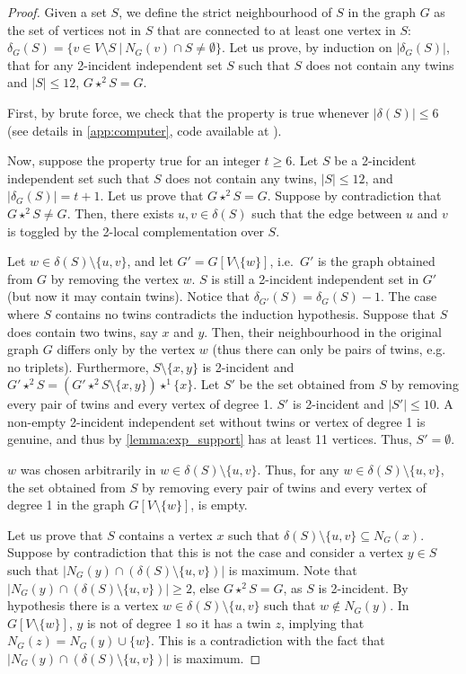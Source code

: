 \documentclass[a4paper,UKenglish,cleveref,autoref,thm-restate]{arxiv}
\newcommand{\se}{\subseteq}
\newcommand{\ls}{\leqslant}
\newcommand{\gs}{\geqslant}
\newcommand{\sm}{\setminus}
\begin{document}
\lessthantwelve*

\begin{proof}
    Given a set $S$, we define the strict neighbourhood of $S$ in the graph $G$ as the set of vertices not in $S$ that are connected to at least one vertex in $S$: $\delta_G(S) = \{v \in V \sm S ~|~ N_G(v) \cap S \neq \emptyset\}$. Let us prove, by induction on $|\delta_G(S)|$, that for any 2-incident independent set $S$ such that $S$ does not contain any twins and $|S| \ls 12$, $G \star^2 S = G$.

    First, by brute force, we check that the property is true whenever $|\delta(S)| \ls 6$ (see details in \cref{app:computer}, code available at \cite{codelulc19}). 

    Now, suppose the property true for an integer $t \gs 6$. Let $S$ be a 2-incident independent set such that $S$ does not contain any twins, $|S| \ls 12$, and $|\delta_G(S)| = t+1$. Let us prove that $G \star^{2} S = G$. Suppose by contradiction that $G \star^{2} S \neq G$. Then, there exists $u,v \in \delta(S)$ such that the edge between $u$ and $v$ is toggled by the 2-local complementation over $S$. 
    
    Let $w \in \delta(S) \sm \{u,v\}$, and let $G' = G[V \sm \{w\}]$, i.e.~$G'$ is the graph obtained from $G$ by removing the vertex $w$. $S$ is still a 2-incident independent set in $G'$ (but now it may contain twins). Notice that $\delta_{G'}(S) = \delta_{G}(S) -1$. The case where $S$ contains no twins contradicts the induction hypothesis. Suppose that $S$ does contain two twins, say $x$ and $y$. Then, their neighbourhood in the original graph $G$ differs only by the vertex $w$ (thus there can only be pairs of twins, e.g. no triplets). Furthermore, $S \sm \{x,y\}$ is 2-incident and $G' \star^2 S = (G' \star^2 S \sm \{x,y\}) \star^1 \{x\}$. Let $S'$ be the set obtained from $S$ by removing every pair of twins and every vertex of degree 1. $S'$ is 2-incident and $|S'|\ls 10$. A non-empty 2-incident independent set without twins or vertex of degree 1 is genuine, and thus by \cref{lemma:exp_support} has at least 11 vertices. Thus, $S' = \emptyset$.

    $w$ was chosen arbitrarily in $w \in \delta(S) \sm \{u,v\}$. Thus, for any $w\in \delta(S) \sm \{u,v\}$, the set obtained from $S$ by removing every pair of twins and every vertex of degree 1 in the graph $G[V \sm \{w\}]$, is empty. 

    Let us prove that $S$ contains a vertex $x$ such that $\delta(S) \sm \{u,v\} \se N_G(x)$. Suppose by contradiction that this is not the case and consider a vertex $y \in S$ such that $|N_G(y) \cap (\delta(S) \sm \{u,v\})|$ is maximum. Note that $|N_G(y) \cap (\delta(S) \sm \{u,v\})| \gs 2$, else  $G \star^2 S = G$, as $S$ is 2-incident. By hypothesis there is a vertex $w \in \delta(S) \sm \{u,v\}$ such that $w \notin N_G(y)$. In $G[V \sm \{w\}]$, $y$ is not of degree 1 so it has a twin $z$, implying that $N_G(z) = N_G(y) \cup \{w\}$. This is a contradiction with the fact that $|N_G(y) \cap (\delta(S) \sm \{u,v\})|$ is maximum.


\end{proof}
\end{document}

